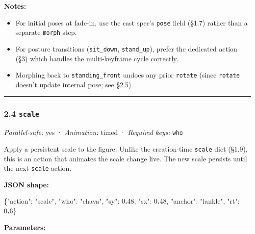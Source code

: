 \documentclass[
  12pt,
  letterpaper,
]{book}
\newenvironment{Shaded}{}{}
\newcommand{\DataTypeTok}[1]{\textcolor[rgb]{0.56,0.13,0.00}{#1}}
\newcommand{\DecValTok}[1]{\textcolor[rgb]{0.25,0.63,0.44}{#1}}
\newcommand{\ErrorTok}[1]{\textcolor[rgb]{1.00,0.00,0.00}{\textbf{#1}}}
\newcommand{\FunctionTok}[1]{\textcolor[rgb]{0.02,0.16,0.49}{#1}}
\newcommand{\StringTok}[1]{\textcolor[rgb]{0.25,0.44,0.63}{#1}}
\providecommand{\tightlist}{%
  \setlength{\itemsep}{0pt}\setlength{\parskip}{0pt}}
\begin{document}
\textbf{Notes:}

\begin{itemize}
\tightlist
\item
  For initial poses at fade-in, use the cast spec's \texttt{pose} field
  (§1.7) rather than a separate \texttt{morph} step.
\item
  For posture transitions (\texttt{sit\_down}, \texttt{stand\_up}),
  prefer the dedicated action (§3) which handles the multi-keyframe
  cycle correctly.
\item
  Morphing back to \texttt{standing\_front} undoes any prior
  \texttt{rotate} (since \texttt{rotate} doesn't update internal pose;
  see §2.5).
\end{itemize}

\begin{center}\rule{0.5\linewidth}{0.5pt}\end{center}

\subsubsection{\texorpdfstring{2.4
\texttt{scale}}{2.4 scale}}\label{scale-1}

\emph{Parallel-safe:} yes · \emph{Animation:} timed · \emph{Required
keys:} \texttt{who}

Apply a persistent scale to the figure. Unlike the creation-time
\texttt{scale} dict (§1.9), this is an action that animates the scale
change live. The new scale persists until the next \texttt{scale}
action.

\textbf{JSON shape:}

\begin{Shaded}
\begin{Highlighting}[]
\FunctionTok{\{}\DataTypeTok{"action"}\FunctionTok{:} \StringTok{"scale"}\FunctionTok{,} \DataTypeTok{"who"}\FunctionTok{:} \StringTok{"chava"}\FunctionTok{,} \DataTypeTok{"sy"}\FunctionTok{:} \DecValTok{0}\ErrorTok{.}\DecValTok{48}\FunctionTok{,} \DataTypeTok{"sx"}\FunctionTok{:} \DecValTok{0}\ErrorTok{.}\DecValTok{48}\FunctionTok{,}
 \DataTypeTok{"anchor"}\FunctionTok{:} \StringTok{"lankle"}\FunctionTok{,} \DataTypeTok{"rt"}\FunctionTok{:} \DecValTok{0}\ErrorTok{.}\DecValTok{6}\FunctionTok{\}}
\end{Highlighting}
\end{Shaded}

\textbf{Parameters:}
\end{document}
